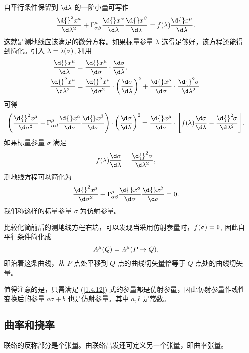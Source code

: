 \documentclass[UTF8, 12pt, a4paper, oneside, onecolumn, fontset=none]{ctexart}
\begin{document}
自平行条件保留到 $\d\lambda$ 的一阶小量可写作
\begin{equation}
\frac{\d{}^{2}x^{\mu}}{\d\lambda^{2}}+\Gamma_{\alpha\beta}^{\mu}\frac{\d{}x^{\alpha}}{\d\lambda}\frac{\d{}x^{\beta}}{\d\lambda}=f\mleft(\lambda\mright)\frac{\d{}x^{\mu}}{\d\lambda}.
\end{equation}
这就是测地线应该满足的微分方程。如果标量参量 $\lambda$ 选得足够好，该方程还能得到简化。引入 $\lambda=\lambda\mleft(\sigma\mright)$, 利用
\begin{align}
\frac{\d{}x^{\mu}}{\d\lambda}&=\frac{\d{}x^{\mu}}{\d\sigma}\cdot\frac{\d\sigma}{\d\lambda},\\
\frac{\d{}^{2}x^{\mu}}{\d\lambda^{2}}&=\frac{\d{}^{2}x^{\mu}}{\d\sigma^{2}}\cdot\mleft(\frac{\d\sigma}{\d\lambda}\mright)^{2}+\frac{\d{}x^{\mu}}{\d\sigma}\cdot\frac{\d{}^{2}\sigma}{\d\lambda^{2}}.
\end{align}
可得
\begin{equation}
\mleft(\frac{\d{}^{2}x^{\mu}}{\d\sigma^{2}}+\Gamma_{\alpha\beta}^{\mu}\frac{\d{}x^{\alpha}}{\d\sigma}\frac{\d{}x^{\beta}}{\d\sigma}\mright)\cdot\mleft(\frac{\d\sigma}{\d\lambda}\mright)^{2}=\frac{\d{}x^{\mu}}{\d\sigma}\cdot\mleft[f\mleft(\lambda\mright)\frac{\d\sigma}{\d\lambda}-\frac{\d{}^{2}\sigma}{\d\lambda^{2}}\mright].
\end{equation}
如果标量参量 $\sigma$ 满足
\begin{equation}
f\mleft(\lambda\mright)\frac{\d\sigma}{\d\lambda}=\frac{\d{}^{2}\sigma}{\d\lambda^{2}},\label{1.4.12}
\end{equation}
测地线方程可以简化为
\begin{equation}
\frac{\d{}^{2}x^{\mu}}{\d\sigma^{2}}+\Gamma_{\alpha\beta}^{\mu}\frac{\d{}x^{\alpha}}{\d\sigma}\frac{\d{}x^{\beta}}{\d\sigma}=0.
\end{equation}
我们称这样的标量参量 $\sigma$ 为仿射参量。

比较化简前后的测地线方程右端，可以发现当采用仿射参量时，$f\mleft(\sigma\mright)=0$, 因此自平行条件简化成
\begin{equation}
A^{\mu}\mleft(Q\mright)=A^{\mu}\mleft(P\to Q\mright),
\end{equation}
即沿着这条曲线，从 $P$ 点处平移到 $Q$ 点的曲线切矢量恰等于 $Q$ 点处的曲线切矢量。

值得注意的是，只需满足 (\ref{1.4.12}) 式的参量都是仿射参量，因此仿射参量作线性变换后的参量 $a\sigma+b$ 也是仿射参量。其中 $a, b$ 是常数。

\subsection{曲率和挠率}
联络的反称部分是个张量。由联络出发还可定义另一个张量，即曲率张量。
\end{document}
